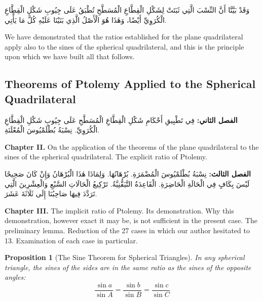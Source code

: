 \documentclass[11pt,a4paper]{article}
\theoremstyle{plain}
\newtheorem{proposition}{Proposition}[section]
\theoremstyle{definition}
\theoremstyle{remark}
\newcommand{\ar}[1]{{\arabicfont\beginR #1\endR}}
\newcommand{\bilingualpair}[2]{%
  \par\noindent
  \begin{minipage}[t]{0.48\textwidth}
  #1
  \end{minipage}%
  \hfill
  \begin{minipage}[t]{0.48\textwidth}
  \vspace*{0pt}#2
  \end{minipage}\par\vspace{0.3cm}%
}
\begin{document}
\vspace{0.3cm}

\bilingualpair{\ar{وَقَدْ بَيَّنَّا أَنَّ النِّسْبَ الَّتِي ثَبَتَتْ لِشَكْلِ الْقِطَّاعِ الْمُسَطَّحِ تُطْبَقُ عَلَى جِيُوبِ شَكْلِ الْقِطَّاعِ الْكُرَوِيِّ أَيْضًا، وَهٰذَا هُوَ الْأَصْلُ الَّذِي بَنَيْنَا عَلَيْهِ كُلَّ مَا يَأْتِي.}}{We have demonstrated that the ratios established for the plane quadrilateral apply also to the sines of the spherical quadrilateral, and this is the principle upon which we have built all that follows.}

\vspace{0.5cm}

\subsection{Theorems of Ptolemy Applied to the Spherical Quadrilateral}
\label{sec:ptolemy}

\bilingualpair{\ar{\textbf{الفصل الثاني:} فِي تَطْبِيقِ أَحْكَامِ شَكْلِ الْقِطَّاعِ الْمُسَطَّحِ عَلَى جِيُوبِ شَكْلِ الْقِطَّاعِ الْكُرَوِيِّ. نِسْبَةُ بُطْلَمْيُوسَ الْمُعْلَنَةِ.}}{\noindent\textbf{Chapter II.} On the application of the theorems of the plane quadrilateral to the sines of the spherical quadrilateral. The explicit ratio of Ptolemy.}

\vspace{0.3cm}

\bilingualpair{\ar{\textbf{الفصل الثالث:} نِسْبَةُ بُطْلَمْيُوسَ الْمُضْمَرَةِ. بُرْهَانُهَا. وَلِمَاذَا هٰذَا الْبُرْهَانُ وَإِنْ كَانَ صَحِيحًا لَيْسَ بِكَافٍ فِي الْحَالَةِ الْحَاضِرَةِ. الْقَاعِدَةُ التَّيَقُّنِيَّةُ. تَرْكِيعُ الْحَالَاتِ السَّبْعِ وَالْعِشْرِينَ الَّتِي تَرَدَّدَ فِيهَا صَاحِبُنَا إِلَى ثَلَاثَةَ عَشَرَ.}}{\noindent\textbf{Chapter III.} The implicit ratio of Ptolemy. Its demonstration. Why this demonstration, however exact it may be, is not sufficient in the present case. The preliminary lemma. Reduction of the 27 cases in which our author hesitated to 13. Examination of each case in particular.}

\vspace{0.5cm}

\begin{proposition}[The Sine Theorem for Spherical Triangles]
In any spherical triangle, the sines of the sides are in the same ratio as the sines of the opposite angles:
\[
\frac{\sin a}{\sin A} = \frac{\sin b}{\sin B} = \frac{\sin c}{\sin C}
\]
\end{proposition}
\end{document}
